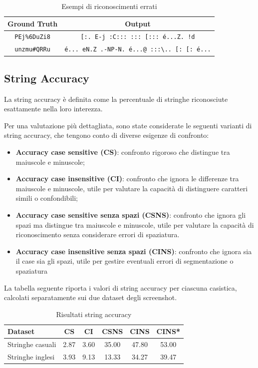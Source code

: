 \begin{table}[htbp]
    \centering
    \begin{tabular}{|c|c|}
        \hline
        \textbf{Ground Truth} & \textbf{Output} \\
        \hline
        \texttt{PEj\%6DuZi8} & \texttt{[:.\ E-j\ :C:::\ :::\ [:::\ é...Z.\ !d} \\
        \hline
        \texttt{unzmu\#QRRu} & \texttt{é...\ eN.Z\ .-NP-N.\ é...@\ :::\textbackslash..\ [:\ [:\ é...} \\
        \hline
    \end{tabular}
    \caption{Esempi di riconoscimenti errati}
    \label{tab:recognition_examples}
\end{table}

\subsection*{String Accuracy}
La string accuracy è definita come la percentuale di stringhe riconosciute esattamente nella loro interezza.

Per una valutazione più dettagliata, sono state considerate le seguenti varianti di string accuracy, che tengono conto di diverse esigenze di confronto:

\begin{itemize}
    \item \textbf{Accuracy case sensitive (CS)}: confronto rigoroso che distingue tra maiuscole e minuscole;
    \item \textbf{Accuracy case insensitive (CI)}: confronto che ignora le differenze tra maiuscole e minuscole, utile per valutare la capacità di distinguere caratteri simili o confondibili;
    \item \textbf{Accuracy case sensitive senza spazi (CSNS)}: confronto che ignora gli spazi ma distingue tra maiuscole e minuscole, utile per valutare la capacità di riconoscimento senza considerare errori di spaziatura.
    \item \textbf{Accuracy case insensitive senza spazi (CINS)}: confronto che ignora sia il case sia gli spazi, utile per gestire eventuali errori di segmentazione o spaziatura

\end{itemize}

La tabella seguente riporta i valori di string accuracy per ciascuna casistica, calcolati separatamente sui due dataset degli screenshot.

\begin{table}[htbp]
    \centering
    \begin{tabular}{lccccc}
        \toprule
        Dataset & CS & CI & CSNS & CINS & CINS* \\
        \midrule
        Stringhe casuali & 2.87 & 3.60 & 35.00 & 47.80 & 53.00 \\
        Stringhe inglesi & 3.93 & 9.13 & 13.33 & 34.27 & 39.47 \\
        \bottomrule
    \end{tabular}
    \caption{Risultati string accuracy}
    \label{tab:string_accuracy_stats}
\end{table}

